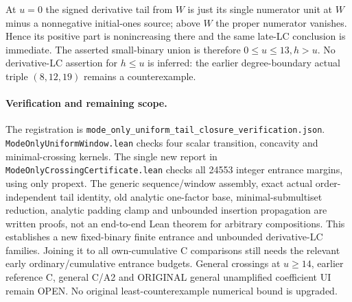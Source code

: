 At $u=0$ the signed derivative tail from $W$ is just its single
numerator unit at $W$ minus a nonnegative initial-ones source;
above $W$ the proper numerator vanishes. Hence its positive part
is nonincreasing there and the same late-LC conclusion is immediate.
The asserted small-binary union is therefore $0\le u\le13,h>u$.
No derivative-LC assertion for $h\le u$ is inferred: the earlier
degree-boundary actual triple $(8,12,19)$ remains a counterexample.

\paragraph{Verification and remaining scope.}
The registration is
\texttt{mode\_only\_uniform\_tail\_closure\_verification.json}.
\texttt{ModeOnlyUniformWindow.lean} checks four scalar transition,
concavity and minimal-crossing kernels. The single new report in
\texttt{ModeOnlyCrossingCertificate.lean} checks all 24553 integer
entrance margins, using only propext. The generic sequence/window
assembly, exact actual order-independent tail identity, old analytic
one-factor base, minimal-submultiset reduction, analytic padding
clamp and unbounded insertion propagation are written proofs, not
an end-to-end Lean theorem for arbitrary compositions.
This establishes a new fixed-binary finite entrance and unbounded
derivative-LC families. Joining it to all own-cumulative C comparisons
still needs the relevant early ordinary/cumulative entrance budgets.
General crossings at $u\ge14$, earlier reference C, general C/A2
and ORIGINAL general unamplified coefficient UI remain OPEN.
No original least-counterexample numerical bound is upgraded.
